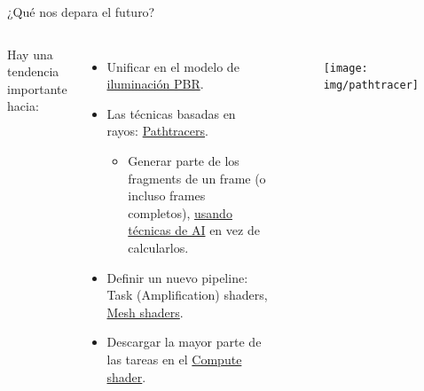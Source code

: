 \begin{frame}{¿Qué nos depara el futuro?}
\begin{columns}
    Hay una tendencia importante hacia:
    \begin{itemize}
        \item Unificar en el modelo de \href{https://en.wikipedia.org/wiki/Physically_based_rendering}{iluminación PBR}.
        \item Las técnicas basadas en rayos: \href{https://en.wikipedia.org/wiki/Path_tracing}{Pathtracers}.
        \begin{itemize}
            \item Generar parte de los fragments de un frame (o incluso frames completos), \href{https://www.youtube.com/watch?v=5PHBXY0FI5o&t=2s}{usando técnicas de AI} en vez de calcularlos.
        \end{itemize}
        \item Definir un nuevo pipeline: Task (Amplification) shaders, \href{https://www.khronos.org/blog/mesh-shading-for-vulkan}{Mesh shaders}.
        \item Descargar la mayor parte de las tareas en el \href{https://en.wikipedia.org/wiki/Compute_kernel}{Compute shader}.
    \end{itemize}
\begin{figure}[htp]
  \centering
  \texttt{[image: img/pathtracer]}
\end{figure}
\end{columns}
\end{frame}

